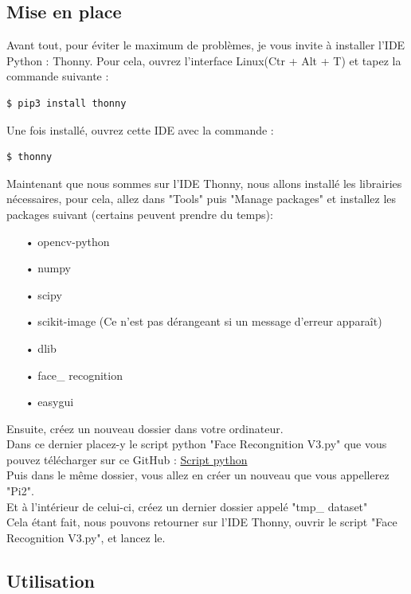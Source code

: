 \documentclass[12pt, oneside]{article}
\begin{document}
\subsection{Mise en place}

Avant tout, pour éviter le maximum de problèmes, je vous invite à installer l'IDE Python : Thonny. Pour cela, ouvrez l'interface Linux(Ctr + Alt + T) et tapez la commande suivante :
\begin{lstlisting}[language=bash]
  $ pip3 install thonny
\end{lstlisting}

Une fois installé, ouvrez cette IDE avec la commande :
\begin{lstlisting}[language=bash]
  $ thonny
\end{lstlisting}

Maintenant que nous sommes sur l'IDE Thonny, nous allons installé les librairies nécessaires, pour cela, allez dans "Tools" puis "Manage packages" et installez les packages suivant (certains peuvent prendre du temps): 
\begin{itemize}
	\item[•] opencv-python
	\item[•] numpy
	\item[•] scipy
	\item[•] scikit-image (Ce n'est pas dérangeant si un message d'erreur apparaît)
 	\item[•] dlib
	\item[•] face\_ recognition
	\item[•] easygui
\end{itemize}

Ensuite, créez un nouveau dossier dans votre ordinateur.\\
Dans ce dernier placez-y le script python "Face Recongnition V3.py" que vous pouvez télécharger sur ce GitHub : \href{https://github.com/MadScientistHK/Pi2_Face_Recognition}{Script python}\\
Puis dans le même dossier, vous allez en créer un nouveau que vous appellerez "Pi2".\\
Et à l'intérieur de celui-ci, créez un dernier dossier appelé "tmp\_ dataset"
\vspace{1cm}
\\
Cela étant fait, nous pouvons retourner sur l'IDE Thonny, ouvrir le script "Face Recognition V3.py", et lancez le.


\subsection{Utilisation}
\end{document}
